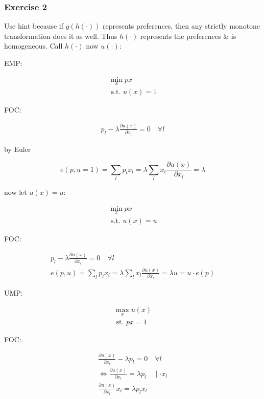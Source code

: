 {{\subsubsection*{Exercise 2}

\begin{enumerate}[label=(\alph*)]
{\item 
Use hint because if $g(h(\cdot))$ represents preferences, then any strictly monotone transformation does it as well.
Thus $h(\cdot)$ represents the preferences \& is homogeneous. 
Call $h(\cdot)$ now $u(\cdot)$: 

EMP:

\begin{align*}
    \min _{x} p x \\
    \text{ s.t. } u(x)=1
\end{align*}

FOC:

\begin{align*}
    p_{l}-\lambda \frac{\partial u(x)}{\partial x_{l}}=0 \quad \forall l
\end{align*}

by Euler

$$
e(p, u=1)=\sum_{l} p_{l} x_{l}=\lambda \sum_{l} x_{l} \frac{\partial u(x)}{\partial x_{l}}=\lambda
$$

now let $u(x)=u$:

\begin{align*}
    \min _{x} p x \\
    \text{ s.t. } u(x)=u
\end{align*}

FOC:

$$
\begin{aligned}
    p_{l}-\lambda \frac{\partial u(x)}{\partial x_{l}}=0 \quad \forall l \\
    e(p, u)=\sum_{l} p_{l} x_{l} 
    =\lambda \sum_{l} x_{l} \frac{\partial u(x)}{\partial x_{l}} 
    =\lambda u=u \cdot e(p)
\end{aligned}
$$
}
{\item 
UMP:

$$
\begin{gathered}
    \max _{x} u(x) \\
    \text { st. } p x=1
\end{gathered}
$$

FOC:

$$
\begin{gathered}
\frac{\partial u(x)}{\partial x_{l}}-\lambda p_{l}=0 \quad \forall l \\
\Leftrightarrow \frac{\partial u(x)}{\partial x_{l}}=\lambda p_{l} \quad \mid \cdot x_{l} \\
\frac{\partial u(x)}{\partial x_{l}} x_{l}=\lambda p_l x_{l}
\end{gathered}
$$

}
\end{enumerate}}}
